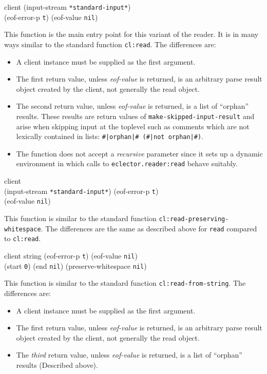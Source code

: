  {client \optional (input-stream \texttt{*standard-input*})\\
  (eof-error-p \texttt{t})
  (eof-value \texttt{nil})}

This function is the main entry point for this variant of the reader.
It is in many ways similar to the standard \commonlisp{} function
\texttt{cl:read}.  The differences are:

\begin{itemize}
\item A client instance must be supplied as the first argument.
\item The first return value, unless \textit{eof-value} is returned,
  is an arbitrary parse result object created by the client, not
  generally the read object.
\item The second return value, unless \textit{eof-value} is returned,
  is a list of ``orphan'' results.  These results are return values of
  \texttt{make-skipped-input-result} and arise when skipping input at
  the toplevel such as comments which are not lexically contained in
  lists: \texttt{\#|orphan|\# (\#|not orphan|\#)}.
\item The function does not accept a \textit{recursive} parameter
  since it sets up a dynamic environment in which calls to
  \texttt{eclector.reader:read} behave suitably.
\end{itemize}

 {client \\
  \optional (input-stream \texttt{*standard-input*})
  (eof-error-p \texttt{t})\\
  (eof-value \texttt{nil})}

This function is similar to the standard \commonlisp{} function
\texttt{cl:read-preserving-whitespace}.  The differences are the same
as described above for \texttt{read} compared to \texttt{cl:read}.

 {client string \optional
  (eof-error-p \texttt{t})
  (eof-value \texttt{nil})\\
  \key
  (start \texttt{0})
  (end \texttt{nil})
  (preserve-whitespace \texttt{nil})}

This function is similar to the standard \commonlisp{} function
\texttt{cl:read-from-string}.  The differences are:

\begin{itemize}
\item A client instance must be supplied as the first argument.
\item The first return value, unless \textit{eof-value} is returned,
  is an arbitrary parse result object created by the client, not
  generally the read object.
\item The \emph{third} return value, unless \textit{eof-value} is
  returned, is a list of ``orphan'' results (Described above).
\end{itemize}

